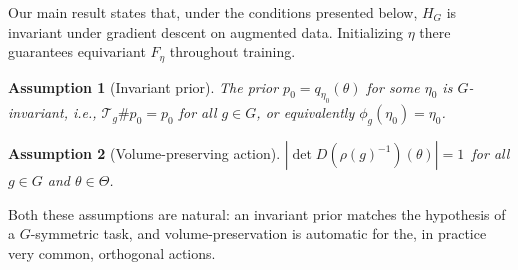 \documentclass{article}
\newtheorem{assumption}{Assumption}
\begin{document}
Our main result states that, under the conditions presented below, $H_{G}$ is invariant under gradient descent on augmented data. Initializing $\eta$ there guarantees equivariant $F_\eta$ throughout training.

\begin{assumption}[Invariant prior]
\label{ass:invariant-prior}
    The prior $p_{0} = q_{\eta_{0}}(\theta)$ for some $\eta_{0}$ is $G$-invariant, i.e., $\mathcal{T}_{g} \# p_{0} = p_{0}$ for all $g \in G$, or equivalently $\phi_{g}(\eta_{0}) = \eta_{0}$.
\end{assumption}

\begin{assumption}[Volume-preserving action]
\label{ass:volume-preserving}
    $|\det D(\rho(g)^{-1})(\theta)| = 1\,$ for all $g \in G$ and $\theta \in \Theta$.
\end{assumption}

 Both these assumptions are natural: an invariant prior
 matches the hypothesis of a $G$-symmetric task,
  and volume-preservation is automatic for the, in practice very common, orthogonal actions.
\end{document}

